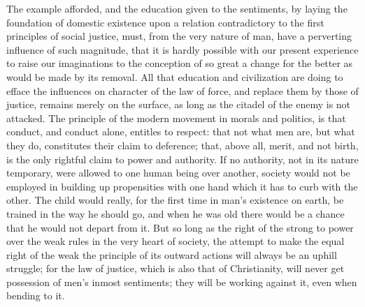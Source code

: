 \documentclass[12pt]{report}
\begin{document}
The example afforded, and the education given to the sentiments, by laying the foundation of domestic existence upon a relation contradictory to the first principles of social justice, must, from the very nature of man, have a perverting influence of such magnitude, that it is hardly possible with our present experience to raise our imaginations to the conception of so great a change for the better as would be made by its removal. All that education and civilization are doing to efface the influences on character of the law of force, and replace them by those of justice, remains merely on the surface, as long as the citadel of the enemy is not attacked. The principle of the modern movement in morals and politics, is that conduct, and conduct alone, entitles to respect: that not what men are, but what they do, constitutes their claim to deference; that, above all, merit, and not birth, is the only rightful claim to power and authority. If no authority, not in its nature temporary, were allowed to one human being over another, society would not be employed in building up propensities with one hand which it has to curb with the other. The child would really, for the first time in man's existence on earth, be trained in the way he should go, and when he was old there would be a chance that he would not depart from it. But so long as the right of the strong to power over the weak rules in the very heart of society, the attempt to make the equal right of the weak the principle of its outward actions will always be an uphill struggle; for the law of justice, which is also that of Christianity, will never get possession of men's inmost sentiments; they will be working against it, even when bending to it.
\end{document}

